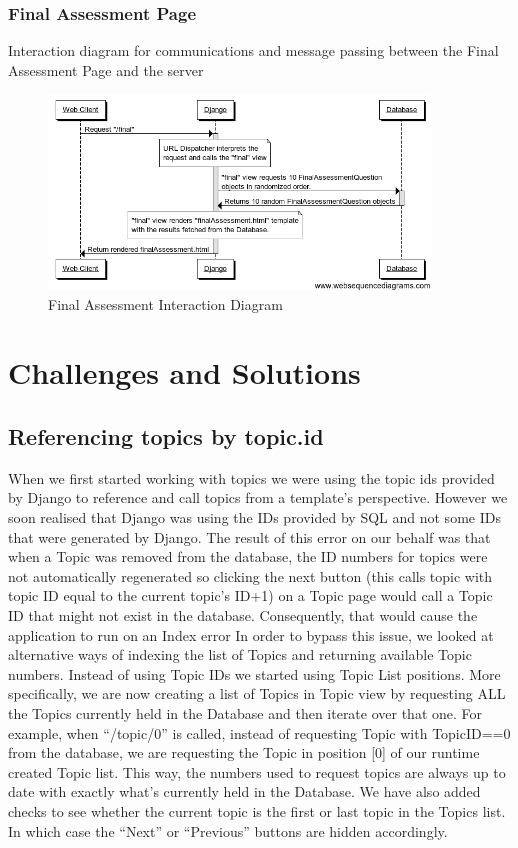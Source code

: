 \documentclass{l3proj}
\begin{document}
{\subsubsection{Final Assessment Page}
Interaction diagram for communications and message passing between the Final Assessment Page and the server
\begin{figure}[!htb]
\caption{Final Assessment Interaction Diagram}
 \centering
\includegraphics[width=0.9\textwidth]{images/finalAssessmentInteractionDiagram.png}
\end{figure}
\section{Challenges and Solutions}
\subsection{Referencing topics by topic.id}
When we first started working with topics we were using the topic ids provided by Django to reference and call topics from a template's perspective. However we soon realised that Django was using the IDs provided by SQL and not some IDs that were generated by Django. The result of this error on our behalf was that when a Topic was removed from the database, the ID numbers for topics were not automatically regenerated so clicking the next button (this calls topic with topic ID equal to the current topic's ID+1) on a Topic page would call a Topic ID that might not exist in the database. Consequently, that would cause the application to run on an Index error In order to bypass this issue, we looked at alternative ways of indexing the list of Topics and returning available Topic numbers.  Instead of using Topic IDs we started using Topic List positions. More specifically, we are now creating a list of Topics in Topic view by requesting ALL the Topics currently held in the Database and then iterate over that one. For example, when “/topic/0” is called, instead of requesting Topic with TopicID==0 from the database, we are requesting the Topic in position [0] of our runtime created Topic list. This way, the numbers used to request topics are always up to date with exactly what's currently held in the Database.  We have also added checks to see whether the current topic is the first or last topic in the Topics list. In which case the “Next” or “Previous” buttons are hidden accordingly.

}
\end{document}
